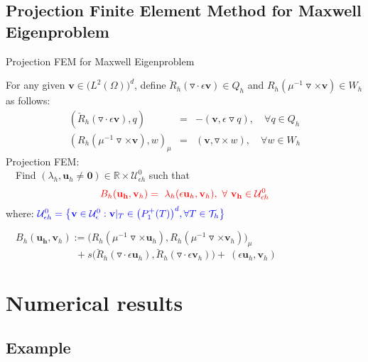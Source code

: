 \documentclass[13pt]{beamer}
\begin{document}
\subsection{Projection Finite Element Method for Maxwell Eigenproblem}
\begin{frame}[t]{Projection FEM for Maxwell Eigenproblem}
  \begin{block}{}
  For any given $\mathbf{v}\in\big(L^2(\Omega)\big)^d$, define $\breve{R}_h(\triangledown\cdot\epsilon\mathbf{v})\in Q_h$ and
  $R_h(\mu^{-1}\triangledown\times\mathbf{v})\in W_h$ as follows:\\[-3ex]
  \begin{eqnarray}
       \nonumber
       (\breve{R}_h(\triangledown\cdot\epsilon\mathbf{v}),q) & = & - (\mathbf{v},\epsilon\triangledown q),\quad  \forall q\in Q_h \\
       \nonumber
       (R_h(\mu^{-1}\triangledown\times\mathbf{v}),w)_{\mu} & = & (\mathbf{v},\triangledown\times w),\quad  \forall w\in W_h
  \end{eqnarray}
  Projection FEM:\\
  $\quad$Find $(\lambda_h, \mathbf{u}_h\neq\mathbf{0})\in\mathbb{R}\times\mathcal{U}^0_{\epsilon h}$ such that\\[-2ex] \[{\color{red}B_h(\mathbf{u_h},\mathbf{v}_h) = \
  \lambda_h(\epsilon\mathbf{u}_h,\mathbf{v}_h),\ \forall\ \mathbf{v_h}\in\mathcal{U}^0_{\epsilon h}}\]
  where: ${\color{blue}\mathcal{U}^0_{\epsilon h} = \big\{\mathbf{v}\in \mathcal{U}^0_{\epsilon}: \mathbf{v}|_T\in\big(P_{1}^{+}(T)\big)^d, \forall T\in \mathcal{T}_h\big\}}$

  $\quad B_h(\mathbf{u_h},\mathbf{v}_h) := \Big(R_h(\mu^{-1}\triangledown\times\mathbf{u}_h),R_h(\mu^{-1}\triangledown\times\mathbf{v}_h)\Big)_{\mu}$ \\ $\qquad\qquad\qquad\quad + s\Big(\breve{R}_h(\triangledown\cdot\epsilon\mathbf{u}_h),\breve{R}_h(\triangledown\cdot\epsilon\mathbf{v}_h)\Big) + \
  (\epsilon\mathbf{u}_h,\mathbf{v}_h)$
  \end{block}
\end{frame}

\section{Numerical results}

\subsection{Example}
\end{document}

